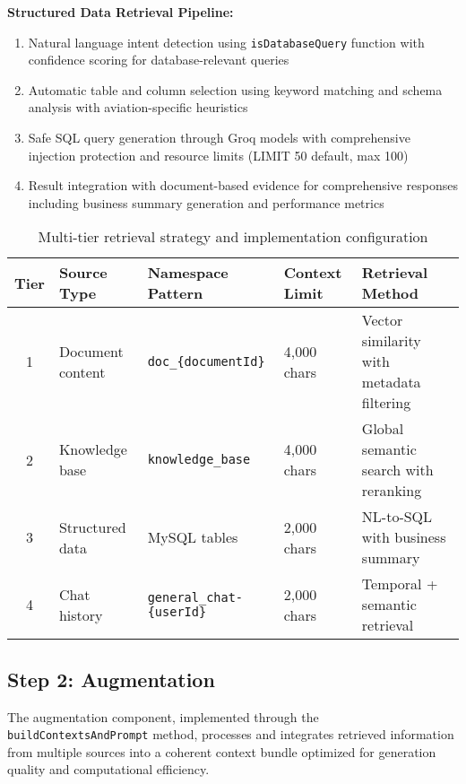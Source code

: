 \textbf{Structured Data Retrieval Pipeline:}
\begin{enumerate}
    \item Natural language intent detection using \texttt{isDatabaseQuery} function with confidence scoring for database-relevant queries
    \item Automatic table and column selection using keyword matching and schema analysis with aviation-specific heuristics
    \item Safe SQL query generation through Groq models with comprehensive injection protection and resource limits (LIMIT 50 default, max 100)
    \item Result integration with document-based evidence for comprehensive responses including business summary generation and performance metrics
\end{enumerate}

\begin{table}[H]
\centering
\caption{Multi-tier retrieval strategy and implementation configuration}
\label{tab:multitier_retrieval_s2}
\begin{tabular}{|c|p{3.5cm}|p{5cm}|p{2cm}|p{3cm}|}
\hline
\textbf{Tier} & \textbf{Source Type} & \textbf{Namespace Pattern} & \textbf{Context Limit} & \textbf{Retrieval Method} \\
\hline
1 & Document content & \texttt{doc\_\{documentId\}} & 4{,}000 chars & Vector similarity with metadata filtering \\
\hline
2 & Knowledge base & \texttt{knowledge\_base} & 4{,}000 chars & Global semantic search with reranking \\
\hline
3 & Structured data & MySQL tables & 2{,}000 chars & NL-to-SQL with business summary \\
\hline
4 & Chat history & \texttt{general\_chat-\{userId\}} & 2{,}000 chars & Temporal + semantic retrieval \\
\hline
\end{tabular}
\end{table}

\subsection{Step 2: Augmentation}
\label{subsec:augmentation_s2}

The augmentation component, implemented through the \texttt{buildContextsAndPrompt} method, processes and integrates retrieved information from multiple sources into a coherent context bundle optimized for generation quality and computational efficiency.

